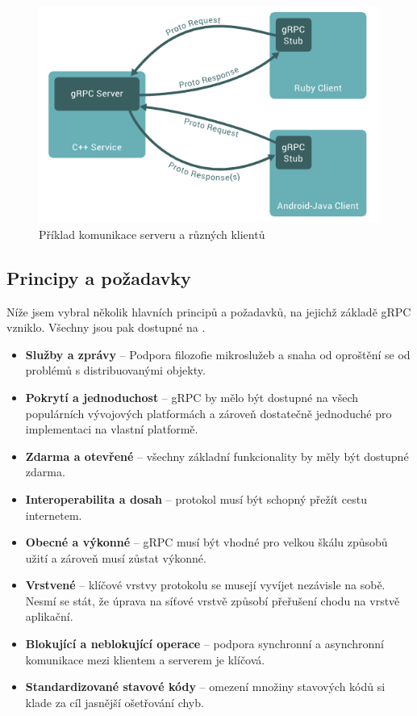 \documentclass[thesis=M,czech]{FITthesis}[2019/12/23]
\begin{document}
\begin{figure}[H]
    \includegraphics[width=\linewidth]{img/grpc-overview.png}
    \caption{Příklad komunikace serveru a různých klientů}
	\label{grpc-overview}
\end{figure}

\subsection{Principy a požadavky}
Níže jsem vybral několik hlavních principů a požadavků, na jejichž základě gRPC vzniklo. Všechny jsou pak dostupné na \cite{grpc_requirements}.
\begin{itemize}
    \item \textbf{Služby a zprávy} -- Podpora filozofie mikroslužeb a snaha od oproštění se od problémů s distribuovanými objekty.
    \item \textbf{Pokrytí a jednoduchost} -- gRPC by mělo být dostupné na všech populárních vývojových platformách a zároveň dostatečně jednoduché pro implementaci na vlastní platformě.
    \item \textbf{Zdarma a otevřené} -- všechny základní funkcionality by měly být dostupné zdarma.
    \item \textbf{Interoperabilita a dosah} -- protokol musí být schopný přežít cestu internetem.
    \item \textbf{Obecné a výkonné} -- gRPC musí být vhodné pro velkou škálu způsobů užití a zároveň musí zůstat výkonné.
    \item \textbf{Vrstvené} -- klíčové vrstvy protokolu se musejí vyvíjet nezávisle na sobě. Nesmí se stát, že úprava na síťové vrstvě způsobí přeřušení chodu na vrstvě aplikační.
    \item \textbf{Blokující a neblokující operace} -- podpora synchronní a asynchronní komunikace mezi klientem a serverem je klíčová.
    \item \textbf{Standardizované stavové kódy} -- omezení množiny stavových kódů si klade za cíl jasnější ošetřování chyb.
\end{itemize}
\end{document}
